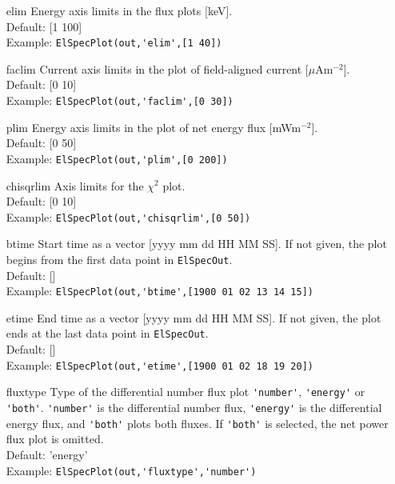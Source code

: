 \documentclass[12pt,a4paper]{report}
\begin{document}
\begin{itemize}
\item[elim] Energy axis limits in the flux plots [keV].\\
Default: [1 100]\\
Example: \verb|ElSpecPlot(out,'elim',[1 40])|\\

\item[faclim] Current axis limits in the plot of field-aligned current [$\mu$Am$^{-2}$].\\
Default: [0 10]\\
Example: \verb|ElSpecPlot(out,'faclim',[0 30])|\\

\item[plim] Energy axis limits in the plot of net energy flux [mWm$^{-2}$].\\
Default: [0 50]\\
Example: \verb|ElSpecPlot(out,'plim',[0 200])|\\

\item[chisqrlim] Axis limits for the $\chi^2$ plot.\\
Default: [0 10]\\
Example: \verb|ElSpecPlot(out,'chisqrlim',[0 50])|\\

\item[btime] Start time as a vector [yyyy mm dd HH MM SS]. If not given, the plot begins from the first data point in \verb|ElSpecOut|.\\
Default: []\\
Example: \verb|ElSpecPlot(out,'btime',[1900 01 02 13 14 15])|\\

\item[etime] End time as a vector [yyyy mm dd HH MM SS]. If not given, the plot ends at the last data point in \verb|ElSpecOut|.\\
Default: []\\
Example: \verb|ElSpecPlot(out,'etime',[1900 01 02 18 19 20])|\\

\item[fluxtype] Type of the differential number flux plot \verb|'number'|, \verb|'energy'| or \verb|'both'|. \verb|'number'| is the differential number flux, \verb|'energy'| is the differential energy flux, and \verb|'both'| plots both fluxes. If \verb|'both'| is selected, the net power flux plot is omitted. \\
Default: 'energy'\\
Example: \verb|ElSpecPlot(out,'fluxtype','number')|\\


\end{itemize}
\end{document}
